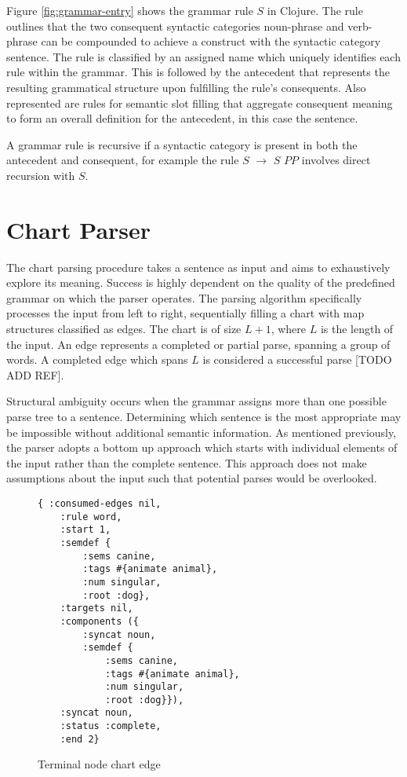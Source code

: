 \documentclass[11pt, a4paper]{article}
\begin{document}
\noindent
Figure \ref{fig:grammar-entry} shows the grammar rule $S$ in Clojure. The rule outlines that the two consequent syntactic categories noun-phrase and verb-phrase can be compounded to achieve a construct with the syntactic category sentence. The rule is classified by an assigned name which uniquely identifies each rule within the grammar. This is followed by the antecedent that represents the resulting grammatical structure upon fulfilling the rule's consequents. Also represented are rules for semantic slot filling that aggregate consequent meaning to form an overall definition for the antecedent, in this case the sentence. 

A grammar rule is recursive if a syntactic category is present in both the antecedent and consequent, for example the rule $S$ $\longrightarrow$ $S$ $PP$ involves direct recursion with $S$.

\section{Chart Parser}\label{sec:chart-parser}

The chart parsing procedure takes a sentence as input and aims to exhaustively explore its meaning. Success is highly dependent on the quality of the predefined grammar on which the parser operates. The parsing algorithm specifically processes the input from left to right, sequentially filling a chart with map structures classified as edges. The chart is of size $L + 1$, where $L$ is the length of the input.  An edge represents a completed or partial parse, spanning a group of words. A completed edge which spans $L$ is considered a successful parse [TODO ADD REF].

Structural ambiguity occurs when the grammar assigns more than one possible parse tree to a sentence. Determining which sentence is the most appropriate may be impossible without additional semantic information. As mentioned previously, the parser adopts a bottom up approach which starts with individual elements of the input rather than the complete sentence. This approach does not make assumptions about the input such that potential parses would be overlooked.



\begin{figure}[H]
\begin{Verbatim}[frame=leftline]
  { :consumed-edges nil,
    :rule word,
    :start 1,
    :semdef {
	    :sems canine,
	    :tags #{animate animal},
	    :num singular,
	    :root :dog},
    :targets nil,
    :components ({
	    :syncat noun,								
	    :semdef {
		    :sems canine,
		    :tags #{animate animal},
		    :num singular,
		    :root :dog}}),
    :syncat noun,
    :status :complete,
    :end 2}
\end{Verbatim}
\caption{Terminal node chart edge}
\label{fig:chart-edge}
\end{figure}
\end{document}
